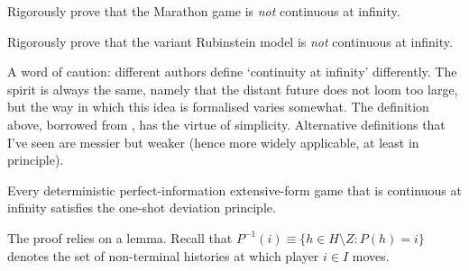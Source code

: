 \addtocounter{exercise}{-2}
\begin{exercise}[continued]
	\label{exercise:marathon_conts}
	Rigorously prove that the Marathon game is \emph{not} continuous at infinity.
\end{exercise}

\begin{exercise}[continued]
	\label{exercise:rubinstein_non-osdp_cont}
	Rigorously prove that the variant Rubinstein model is \emph{not} continuous at infinity.
\end{exercise}

A word of caution: different authors define `continuity at infinity' differently. The spirit is always the same, namely that the distant future does not loom too large, but the way in which this idea is formalised varies somewhat. The definition above, borrowed from \textcite[section~4.2]{FudenbergTirole1991book}, has the virtue of simplicity. Alternative definitions that I've seen are messier but weaker (hence more widely applicable, at least in principle).

\begin{proposition}
	\label{proposition:osdp_infinite}
	Every deterministic perfect-information extensive-form game that is continuous at infinity satisfies the one-shot deviation principle.
\end{proposition}

The proof relies on a lemma. Recall that $P^{-1}(i) \equiv \{ h \in H \setminus Z : P(h) = i \}$ denotes the set of non-terminal histories at which player $i \in I$ moves.

